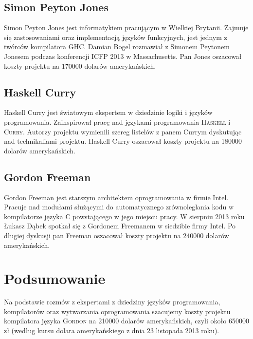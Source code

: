\documentclass{documentation}
\begin{document}
\subsection{Simon Peyton Jones}
\noindent Simon Peyton Jones jest informatykiem pracującym w Wielkiej Brytanii.
Zajmuje się zastosowaniami oraz implementacją języków funkcyjnych, jest jednym
z twórców kompilatora \textsc{GHC}.  Damian Bogel rozmawiał z Simonem Peytonem
Jonesem podczas konferencji ICFP 2013 w Massachusetts.  Pan Jones oszacował
koszty projektu na 170000 dolarów amerykańskich.

\subsection{Haskell Curry}
\noindent Haskell Curry jest światowym ekspertem w dziedzinie logiki i języków programowania.
Zainspirował pracę nad językami programowania \textsc{Haskell} i \textsc{Curry}.
Autorzy projektu wymienili szereg listelów z panem Currym dyskutując nad technikaliami
projektu. Haskell Curry oszacował koszty projektu na 180000 dolarów amerykańskich.

\subsection{Gordon Freeman}
\noindent Gordon Freeman jest starszym architektem oprogramowania w firmie Intel. Pracuje nad
modułami służącymi do automatycznego zrównoleglania kodu w kompilatorze języka \textsc{C}
powstającego w jego miejscu pracy. W sierpniu 2013 roku Łukasz Dąbek spotkał się
z Gordonem Freemanem w siedzibie firmy Intel. Po długiej dyskusji pan Freeman oszacował
koszty projektu na 240000 dolarów amerykańskich.

\section{Podsumowanie}
\noindent Na podstawie rozmów z ekspertami z dziedziny języków programowania, kompilatorów oraz
wytwarzania oprogramowania szacujemy koszty projektu kompilatora języka \textsc{Gordon}
na 210000 dolarów amerykańskich, czyli około 650000 zł (według kursu dolara amerykańskiego z
dnia 23 listopada 2013 roku).
\end{document}
